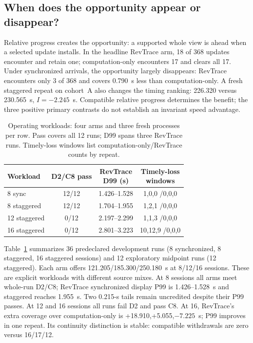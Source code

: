\subsection{When does the opportunity appear or disappear?}
Relative progress creates the opportunity: a supported whole view is
ahead when a selected update installs. In the headline RevTrace arm, 18 of 368 updates encounter
and retain one; computation-only encounters 17 and clears all 17. Under
synchronized arrivals, the opportunity largely disappears: RevTrace
encounters only 3 of 368 and covers 0.790~s
less than computation-only. A fresh staggered repeat on cohort~A also
changes the timing ranking: 226.320 versus 230.565~s, $I=-2.245$~s.
Compatible relative progress determines the benefit; the three positive
primary contrasts do not establish an invariant speed advantage.

\begin{table}[t]
\centering
\caption{Operating workloads: four arms and three fresh processes per row.
Pass covers all 12 runs; D99 spans three RevTrace runs. Timely-loss windows
list computation-only/RevTrace counts by repeat.}
\label{tab:operating_workloads}
\small\setlength{\tabcolsep}{3pt}
\begin{tabular}{@{}lccc@{}}
\toprule
Workload & D2/C8 pass & \shortstack{RevTrace\\D99 (s)} &
\shortstack{Timely-loss\\windows}\\
\midrule
8 sync &12/12 &1.426--1.528 &1,0,0 /0,0,0\\
8 staggered &12/12 &1.704--1.955 &1,2,1 /0,0,0\\
12 staggered &0/12 &2.197--2.299 &1,1,3 /0,0,0\\
16 staggered &0/12 &2.801--3.223 &10,12,9 /0,0,0\\
\bottomrule
\end{tabular}
\end{table}

Table~\ref{tab:operating_workloads} summarizes 36 predeclared development
runs (8 synchronized, 8 staggered, 16 staggered sessions) and 12 exploratory
midpoint runs (12 staggered). Each arm offers 121.205/185.300/250.180~s
at 8/12/16 sessions. These are explicit workloads with different source
mixes. At 8 sessions all arms meet whole-run D2/C8; RevTrace synchronized
display P99 is 1.426--1.528~s and staggered reaches 1.955~s. Two 0.215-s
tails remain uncredited despite their P99 passes. At 12 and 16 sessions
all runs fail D2 and pass C8. At 16, RevTrace's extra coverage over
computation-only is +18.910,+5.055,$-7.225$~s; P99 improves in one repeat.
Its continuity distinction is stable: compatible withdrawals are zero
versus 16/17/12.

